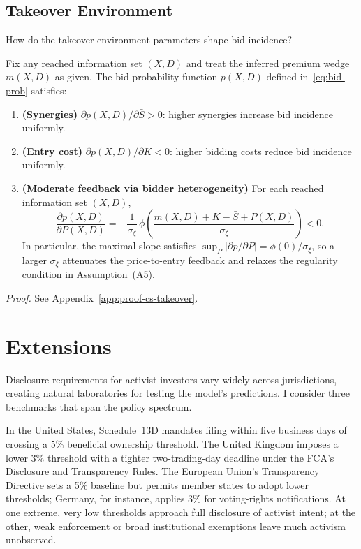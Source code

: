 \subsection{Takeover Environment}

How do the takeover environment parameters shape bid incidence?

\begin{proposition}
\label{prop:cs-takeover}
Fix any reached information set $(X,D)$ and treat the inferred premium wedge $m(X,D)$ as given. The bid probability function $p(X,D)$ defined in~\eqref{eq:bid-prob} satisfies:
\begin{enumerate}[label=\textup{(\alph*)},leftmargin=2em]
\item \textbf{(Synergies)} $\partial p(X,D) / \partial \bar{S} > 0$: higher synergies increase bid incidence uniformly.
\item \textbf{(Entry cost)} $\partial p(X,D) / \partial K < 0$: higher bidding costs reduce bid incidence uniformly.
\item \textbf{(Moderate feedback via bidder heterogeneity)} For each reached information set $(X,D)$,
\[
\frac{\partial p(X,D)}{\partial P(X,D)}=-\frac{1}{\sigma_\xi}\,\phi\!\left(\frac{m(X,D)+K-\bar{S}+P(X,D)}{\sigma_\xi}\right)<0.
\]
In particular, the maximal slope satisfies $\sup_{P}\bigl|\partial p/\partial P\bigr|=\phi(0)/\sigma_\xi$, so a larger $\sigma_\xi$ attenuates the price-to-entry feedback and relaxes the regularity condition in Assumption~\textup{(A5)}.
\end{enumerate}
\end{proposition}
\textit{Proof.} See Appendix~\ref{app:proof-cs-takeover}.

\section{Extensions}
\label{sec:extensions}

Disclosure requirements for activist investors vary widely across jurisdictions, creating natural laboratories for testing the model's predictions. I consider three benchmarks that span the policy spectrum.

In the United States, Schedule~13D mandates filing within five business days of crossing a 5\% beneficial ownership threshold. The United Kingdom imposes a lower 3\% threshold with a tighter two-trading-day deadline under the FCA's Disclosure and Transparency Rules. The European Union's Transparency Directive sets a 5\% baseline but permits member states to adopt lower thresholds; Germany, for instance, applies 3\% for voting-rights notifications. At one extreme, very low thresholds approach full disclosure of activist intent; at the other, weak enforcement or broad institutional exemptions leave much activism unobserved.


